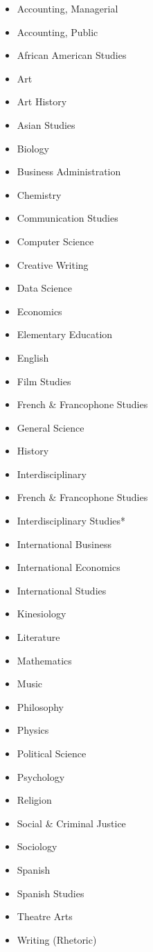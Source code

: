\documentclass[
  letterpaper,
]{scrbook}
\providecommand{\tightlist}{%
  \setlength{\itemsep}{0pt}\setlength{\parskip}{0pt}}
\begin{document}
\begin{itemize}
\tightlist
\item
  Accounting, Managerial
\item
  Accounting, Public
\item
  African American Studies
\item
  Art
\item
  Art History
\item
  Asian Studies
\item
  Biology
\item
  Business Administration
\item
  Chemistry
\item
  Communication Studies
\item
  Computer Science
\item
  Creative Writing
\item
  Data Science
\item
  Economics
\item
  Elementary Education
\item
  English
\item
  Film Studies
\item
  French \& Francophone Studies
\item
  General Science
\item
  History\\
\item
  Interdisciplinary
\item
  French \& Francophone Studies
\item
  Interdisciplinary Studies*
\item
  International Business
\item
  International Economics
\item
  International Studies
\item
  Kinesiology
\item
  Literature
\item
  Mathematics
\item
  Music
\item
  Philosophy
\item
  Physics
\item
  Political Science
\item
  Psychology
\item
  Religion
\item
  Social \& Criminal Justice
\item
  Sociology
\item
  Spanish
\item
  Spanish Studies
\item
  Theatre Arts
\item
  Writing (Rhetoric)
\end{itemize}
\end{document}
